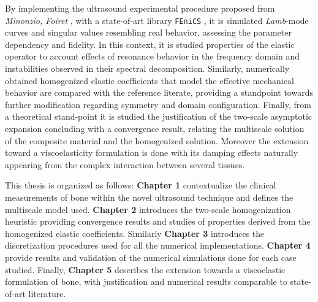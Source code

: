 \begin{intro}

By implementing the ultrasound experimental procedure proposed from \textit{Minonzio, Foiret} \cite{Foiret2014}, \cite{Minonzio2018} with a state-of-art library \texttt{FEniCS} \cite{logg2012automated}, it is simulated  \textit{Lamb}-mode curves and singular values resembling real behavior, assessing the parameter dependency and fidelity. In this context, it is studied properties of the elastic operator to account effects of resonance behavior in the frequency domain and instabilities observed in their spectral decomposition.
Similarly, numerically obtained homogenized elastic coefficients that model the effective mechanical behavior are compared with the reference literate, providing a standpoint towards further modification regarding symmetry and domain configuration.
Finally, from a theoretical stand-point it is studied the justification of the two-scale asymptotic expansion concluding with a convergence result, relating the multiscale solution of the composite material and the homogenized solution. Moreover the extension toward a viscoelasticity formulation is done with its damping effects naturally appearing from the complex interaction between several tissues.

This thesis is organized as follows: \textbf{Chapter 1} contextualize the clinical measurements of bone within the novel ultrasound technique and defines the multiscale model used. \textbf{Chapter 2} introduces the two-scale homogenization heuristic providing convergence results and studies of properties derived from the homogenized elastic coefficients. Similarly \textbf{Chapter 3} introduces the discretization procedures used for all the numerical implementations. \textbf{Chapter 4} provide results and validation of the numerical simulations done for each case studied. Finally, \textbf{Chapter 5} describes the extension towards a viscoelastic formulation of bone, with justification and numerical results comparable to state-of-art literature.

\end{intro}